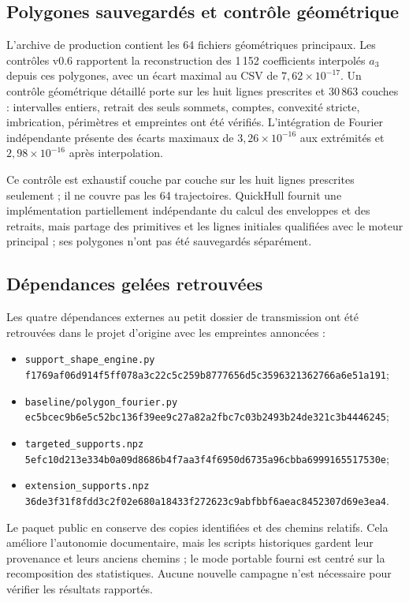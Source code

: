 \documentclass[11pt,a4paper]{article}
\newcommand{\code}[1]{\texttt{#1}}
\newcommand{\sha}[1]{{\small\ttfamily\nolinkurl{#1}}}
\begin{document}
\subsection{Polygones sauvegardés et contrôle géométrique}

L'archive de production contient les 64 fichiers géométriques principaux. Les contrôles v0.6 rapportent la reconstruction des 1\,152 coefficients interpolés $a_3$ depuis ces polygones, avec un écart maximal au CSV de $7{,}62\times10^{-17}$. Un contrôle géométrique détaillé porte sur les huit lignes prescrites et $30\,863$ couches : intervalles entiers, retrait des seuls sommets, comptes, convexité stricte, imbrication, périmètres et empreintes ont été vérifiés. L'intégration de Fourier indépendante présente des écarts maximaux de $3{,}26\times10^{-16}$ aux extrémités et $2{,}98\times10^{-16}$ après interpolation.

Ce contrôle est exhaustif couche par couche sur les huit lignes prescrites seulement ; il ne couvre pas les 64 trajectoires. QuickHull fournit une implémentation partiellement indépendante du calcul des enveloppes et des retraits, mais partage des primitives et les lignes initiales qualifiées avec le moteur principal ; ses polygones n'ont pas été sauvegardés séparément.

\subsection{Dépendances gelées retrouvées}

Les quatre dépendances externes au petit dossier de transmission ont été retrouvées dans le projet d'origine avec les empreintes annoncées :
\begin{itemize}
  \item \code{support\_shape\_engine.py}\\[-0.2em]
    \sha{f1769af06d914f5ff078a3c22c5c259b8777656d5c3596321362766a6e51a191};\par
  \item \code{baseline/polygon\_fourier.py}\\[-0.2em]
    \sha{ec5bcec9b6e5c52bc136f39ee9c27a82a2fbc7c03b2493b24de321c3b4446245};\par
  \item \code{targeted\_supports.npz}\\[-0.2em]
    \sha{5efc10d213e334b0a09d8686b4f7aa3f4f6950d6735a96cbba6999165517530e};\par
  \item \code{extension\_supports.npz}\\[-0.2em]
    \sha{36de3f31f8fdd3c2f02e680a18433f272623c9abfbbf6aeac8452307d69e3ea4}.\par
\end{itemize}
Le paquet public en conserve des copies identifiées et des chemins relatifs. Cela améliore l'autonomie documentaire, mais les scripts historiques gardent leur provenance et leurs anciens chemins ; le mode portable fourni est centré sur la recomposition des statistiques. Aucune nouvelle campagne n'est nécessaire pour vérifier les résultats rapportés.
\end{document}
